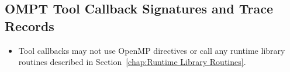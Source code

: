%
%
%
%
%
%
%
%
%
%
%
%
%


\subsection{OMPT Tool Callback Signatures and Trace Records}
\label{sec:ompt-tool-callbacks}

\restrictions
\begin{itemize}
\item Tool callbacks may not use OpenMP directives or call any runtime library routines
described in Section~\ref{chap:Runtime Library Routines}.
\end{itemize}

